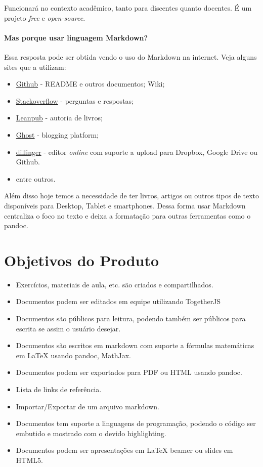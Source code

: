 Funcionará no contexto acadêmico, tanto para discentes quanto docentes.
É um projeto \emph{free} e \emph{open-source}.

\paragraph{Mas porque usar linguagem Markdown?}

Essa resposta pode ser obtida vendo o uso do Markdown na internet. Veja
alguns sites que a utilizam:

\begin{itemize}
\item
  \href{http://github.com}{Github} - README e outros documentos; Wiki;
\item
  \href{http://stackoverflow.com/}{Stackoverflow} - perguntas e
  respostas;
\item
  \href{https://leanpub.com/authors\#how\_leanpub\_works}{Leanpub} -
  autoria de livros;
\item
  \href{https://ghost.org/}{Ghost} - blogging platform;
\item
  \href{https://github.com/joemccann/dillinger}{dillinger} - editor
  \emph{online} com suporte a upload para Dropbox, Google Drive ou
  Github.
\item
  entre outros.
\end{itemize}
Além disso hoje temos a necessidade de ter livros, artigos ou outros
tipos de texto disponíveis para Desktop, Tablet e smartphones. Dessa
forma usar Markdown centraliza o foco no texto e deixa a formatação para
outras ferramentas como o pandoc.

\section{Objetivos do Produto}

\begin{itemize}
\item
  Exercícios, materiais de aula, etc. são criados e compartilhados.
\item
  Documentos podem ser editados em equipe utilizando TogetherJS
\item
  Documentos são públicos para leitura, podendo também ser públicos para
  escrita se assim o usuário desejar.
\item
  Documentos são escritos em markdown com suporte a fórmulas matemáticas
  em LaTeX usando pandoc, MathJax.
\item
  Documentos podem ser exportados para PDF ou HTML usando pandoc.
\item
  Lista de links de referência.
\item
  Importar/Exportar de um arquivo markdown.
\item
  Documentos tem suporte a linguagens de programação, podendo o código
  ser embutido e mostrado com o devido highlighting.
\item
  Documentos podem ser apresentações em LaTeX beamer ou slides em HTML5.
\end{itemize}
